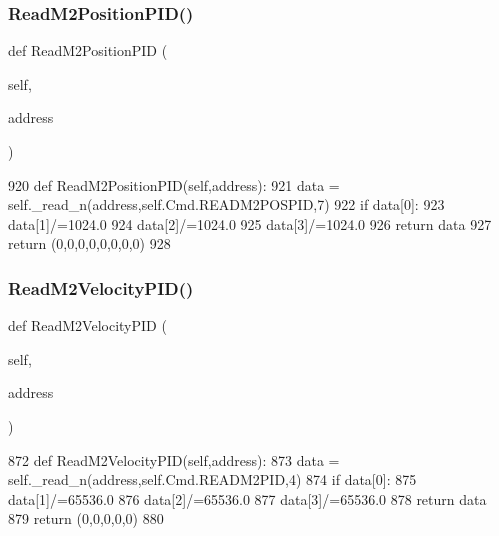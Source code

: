 \subsubsection{\texorpdfstring{Read\+M2\+Position\+P\+I\+D()}{ReadM2PositionPID()}}
{\footnotesize\ttfamily def Read\+M2\+Position\+P\+ID (\begin{DoxyParamCaption}\item[{}]{self,  }\item[{}]{address }\end{DoxyParamCaption})}


\begin{DoxyCode}
920     \textcolor{keyword}{def }ReadM2PositionPID(self,address):
921         data = self.\_read\_n(address,self.Cmd.READM2POSPID,7)
922         \textcolor{keywordflow}{if} data[0]:
923             data[1]/=1024.0
924             data[2]/=1024.0
925             data[3]/=1024.0
926             \textcolor{keywordflow}{return} data
927         \textcolor{keywordflow}{return} (0,0,0,0,0,0,0,0)
928 
\end{DoxyCode}
\mbox{\label{classtoxic__hardware_1_1roboclaw__3_1_1Roboclaw_a6130b63fbb5a30686b1f356a3429f0c2}} 
\subsubsection{\texorpdfstring{Read\+M2\+Velocity\+P\+I\+D()}{ReadM2VelocityPID()}}
{\footnotesize\ttfamily def Read\+M2\+Velocity\+P\+ID (\begin{DoxyParamCaption}\item[{}]{self,  }\item[{}]{address }\end{DoxyParamCaption})}


\begin{DoxyCode}
872     \textcolor{keyword}{def }ReadM2VelocityPID(self,address):
873         data = self.\_read\_n(address,self.Cmd.READM2PID,4)
874         \textcolor{keywordflow}{if} data[0]:
875             data[1]/=65536.0
876             data[2]/=65536.0
877             data[3]/=65536.0
878             \textcolor{keywordflow}{return} data
879         \textcolor{keywordflow}{return} (0,0,0,0,0)
880 
\end{DoxyCode}
\mbox{\label{classtoxic__hardware_1_1roboclaw__3_1_1Roboclaw_abb5901cba752131303b0378bbaf59c38}} 
